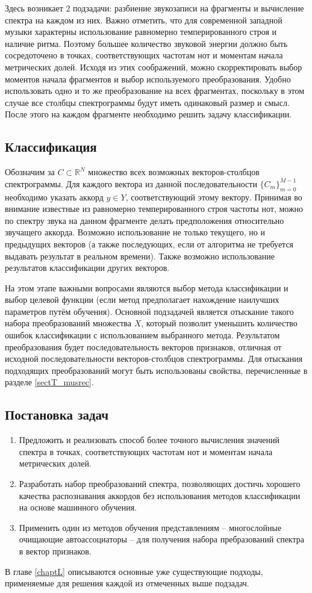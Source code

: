 Здесь возникает 2 подзадачи: разбиение звукозаписи на фрагменты и вычисление
спектра на каждом из них. Важно отметить, что для современной западной музыки
характерны использование равномерно темперированного строя и наличие ритма.
Поэтому большее количество звуковой энергии должно быть сосредоточено в точках,
соответствующих частотам нот и моментам начала метрических долей. Исходя из этих
соображений, можно скорректировать выбор моментов начала фрагментов и выбор
используемого преобразования. Удобно использовать одно и то же преобразование на
всех фрагментах, поскольку в этом случае все столбцы спектрограммы будут иметь
одинаковый размер и смысл. После этого на каждом фрагменте необходимо решить
задачу классификации.

\subsection{Классификация}

Обозначим за $C \subset \mathbb{R}^N$ множество всех возможных векторов-столбцов
спектрограммы. Для каждого вектора из данной последовательности
$\{C_m\}_{m=0}^{M-1}$ необходимо указать аккорд $y \in Y$, соответствующий
этому вектору. Принимая во внимание известные из равномерно темперированного
строя частоты нот, можно по спектру звука на данном фрагменте делать
предположения относительно звучащего аккорда. Возможно использование не только
текущего, но и предыдущих векторов (а также последующих, если от алгоритма не
требуется выдавать результат в реальном времени). Также возможно использование
результатов классификации других векторов.

На этом этапе важными вопросами являются выбор метода классификации и выбор
целевой функции (если метод предполагает нахождение наилучших параметров путём
обучения). Основной подзадачей является отыскание такого набора преобразований
множества $X$, который позволит уменьшить количество ошибок классификации с
использованием выбранного метода. Результатом преобразования будет
последовательность векторов признаков, отличная от исходной последовательности
векторов-столбцов спектрограммы. Для отыскания подходящих преобразований могут
быть использованы свойства, перечисленные в разделе \ref{sectT_musrec}.

\subsection{Постановка задач}

\begin{enumerate}
  \item Предложить и реализовать способ более точного вычисления значений
  спектра в точках, соответствующих частотам нот и моментам начала метрических
  долей.
  \item Разработать набор преобразований спектра, позволяющих достичь хорошего
  качества распознавания аккордов без использования методов классификации на
  основе машинного обучения.
  \item Применить один из методов обучения представлениям -- многослойные
  очищающие автоассоциаторы -- для получения набора пребразований спектра в
  вектор признаков.
\end{enumerate}

В главе \ref{chaptL} описываются основные уже существующие подходы, применяемые
для решения каждой из отмеченных выше подзадач.

\clearpage